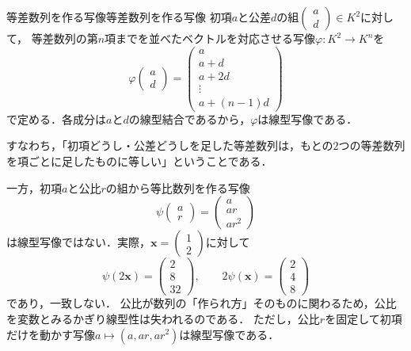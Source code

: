 \begin{example}{等差数列を作る写像}{等差数列を作る写像}
  初項$a$と公差$d$の組$\begin{pmatrix} a \\ d \end{pmatrix} \in K^2$に対して，
  等差数列の第$n$項までを並べたベクトルを対応させる写像$\varphi \colon K^2 \to K^n$を
  \[
    \varphi \begin{pmatrix} a \\ d \end{pmatrix}
    = \begin{pmatrix} a \\ a + d \\ a + 2d \\ \vdots \\ a + (n-1)d \end{pmatrix}
  \]
  で定める．各成分は$a$と$d$の線型結合であるから，$\varphi$は線型写像である．

  すなわち，「初項どうし・公差どうしを足した等差数列は，もとの$2$つの等差数列を項ごとに足したものに等しい」ということである．

  一方，初項$a$と公比$r$の組から等比数列を作る写像
  \[
    \psi \begin{pmatrix} a \\ r \end{pmatrix} = \begin{pmatrix} a \\ ar \\ ar^2 \end{pmatrix}
  \]
  は線型写像ではない．実際，$\bm{x} = \begin{pmatrix} 1 \\ 2 \end{pmatrix}$に対して
  \[
    \psi(2\bm{x}) = \begin{pmatrix} 2 \\ 8 \\ 32 \end{pmatrix}, \qquad
    2\psi(\bm{x}) = \begin{pmatrix} 2 \\ 4 \\ 8 \end{pmatrix}
  \]
  であり，一致しない．
  公比が数列の「作られ方」そのものに関わるため，公比を変数とみるかぎり線型性は失われるのである．
  ただし，公比$r$を固定して初項だけを動かす写像$a \mapsto (a, ar, ar^2)$は線型写像である．
\end{example}


